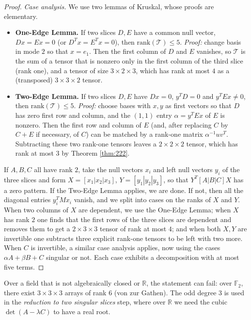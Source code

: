 \begin{proof}
    \textit{Case analysis.} We use two lemmas of Kruskal, whose proofs are elementary.
    \begin{itemize}
      \item \textbf{One-Edge Lemma.} If two slices $D, E$ have a common null vector, $Dx = Ex = 0$ (or $D^T x = E^T x = 0$), then $\mathrm{rank}(\mathcal{T}) \leq 5$. \textit{Proof:} change basis in mode $2$ so that $x = e_1$. Then the first column of $D$ and $E$ vanishes, so $\mathcal{T}$ is the sum of a tensor that is nonzero only in the first column of the third slice (rank one), and a tensor of size $3 \times 2 \times 3$, which has rank at most $4$ as a (transposed) $3 \times 3 \times 2$ tensor.
      \item \textbf{Two-Edge Lemma.} If two slices $D, E$ have $Dx = 0$, $y^T D = 0$ and $y^T E x \neq 0$, then $\mathrm{rank}(\mathcal{T}) \leq 5$. \textit{Proof:} choose bases with $x, y$ as first vectors so that $D$ has zero first row and column, and the $(1,1)$ entry $\alpha = y^T E x$ of $E$ is nonzero. Then the first row and column of $E$ (and, after replacing $C$ by $C + E$ if necessary, of $C$) can be matched by a rank-one matrix $\alpha^{-1} u v^T$. Subtracting these two rank-one tensors leaves a $2 \times 2 \times 2$ tensor, which has rank at most $3$ by Theorem \ref{thm:222}.
    \end{itemize}
    If $A, B, C$ all have rank $2$, take the null vectors $x_i$ and left null vectors $y_i$ of the three slices and form $X = [x_1 | x_2 | x_3]$, $Y = [y_1 | y_2 | y_3]$, so that $Y^T [A|B|C] X$ has a zero pattern. If the Two-Edge Lemma applies, we are done. If not, then all the diagonal entries $y_i^T M x_i$ vanish, and we split into cases on the ranks of $X$ and $Y$. When two columns of $X$ are dependent, we use the One-Edge Lemma; when $X$ has rank $2$ one finds that the first rows of the three slices are dependent and removes them to get a $2 \times 3 \times 3$ tensor of rank at most $4$; and when both $X, Y$ are invertible one subtracts three explicit rank-one tensors to be left with two more. When $C$ is invertible, a similar case analysis applies, now using the cases $\alpha A + \beta B + C$ singular or not. Each case exhibits a decomposition with at most five terms.
  \end{proof}

  Over a field that is not algebraically closed or $\mathbb{R}$, the statement can fail: over $\mathbb{F}_2$, there exist $3 \times 3 \times 3$ arrays of rank $6$ (von zur Gathen). The odd degree $3$ is used in the \textit{reduction to two singular slices} step, where over $\mathbb{R}$ we need the cubic $\det(A - \lambda C)$ to have a real root.

